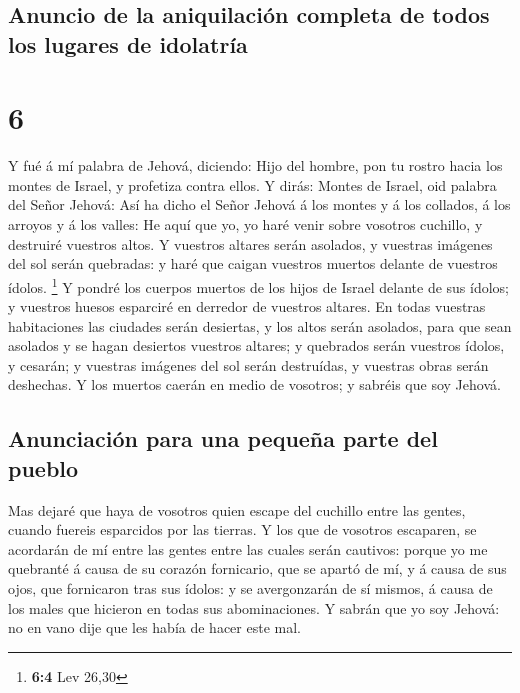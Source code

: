 \hypertarget{anuncio-de-la-aniquilaciuxf3n-completa-de-todos-los-lugares-de-idolatruxeda}{%
\subsection{Anuncio de la aniquilación completa de todos los lugares de
idolatría}\label{anuncio-de-la-aniquilaciuxf3n-completa-de-todos-los-lugares-de-idolatruxeda}}

\hypertarget{section-5}{%
\section{6}\label{section-5}}

 Y fué á mí palabra de Jehová, diciendo:  Hijo
del hombre, pon tu rostro hacia los montes de Israel, y profetiza contra
ellos.  Y dirás: Montes de Israel, oid palabra del Señor
Jehová: Así ha dicho el Señor Jehová á los montes y á los collados, á
los arroyos y á los valles: He aquí que yo, yo haré venir sobre vosotros
cuchillo, y destruiré vuestros altos.  Y vuestros altares
serán asolados, y vuestras imágenes del sol serán quebradas: y haré que
caigan vuestros muertos delante de vuestros ídolos. \footnote{\textbf{6:4}
  Lev 26,30}  Y pondré los cuerpos muertos de los hijos de
Israel delante de sus ídolos; y vuestros huesos esparciré en derredor de
vuestros altares.  En todas vuestras habitaciones las
ciudades serán desiertas, y los altos serán asolados, para que sean
asolados y se hagan desiertos vuestros altares; y quebrados serán
vuestros ídolos, y cesarán; y vuestras imágenes del sol serán
destruídas, y vuestras obras serán deshechas.  Y los muertos
caerán en medio de vosotros; y sabréis que soy Jehová.

\hypertarget{anunciaciuxf3n-para-una-pequeuxf1a-parte-del-pueblo}{%
\subsection{Anunciación para una pequeña parte del
pueblo}\label{anunciaciuxf3n-para-una-pequeuxf1a-parte-del-pueblo}}

 Mas dejaré que haya de vosotros quien escape del cuchillo
entre las gentes, cuando fuereis esparcidos por las tierras.
 Y los que de vosotros escaparen, se acordarán de mí entre
las gentes entre las cuales serán cautivos: porque yo me quebranté á
causa de su corazón fornicario, que se apartó de mí, y á causa de sus
ojos, que fornicaron tras sus ídolos: y se avergonzarán de sí mismos, á
causa de los males que hicieron en todas sus abominaciones.
 Y sabrán que yo soy Jehová: no en vano dije que les había
de hacer este mal.


